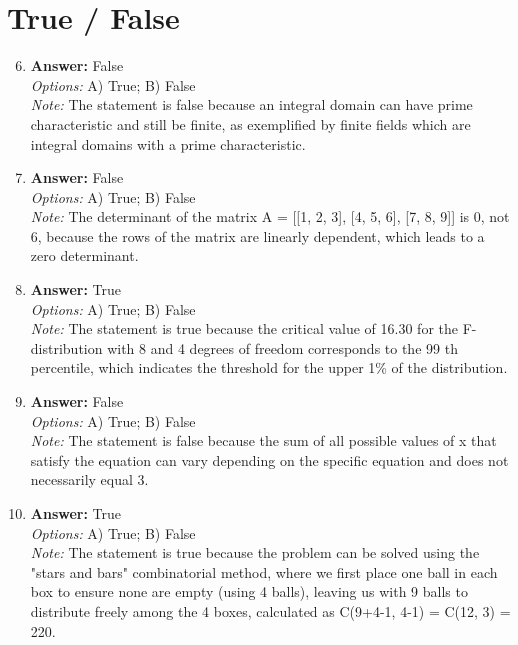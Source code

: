 \documentclass[12pt]{article}
\begin{document}
\section*{True / False}
\begin{enumerate}[label=\arabic*.]
\setcounter{enumi}{5}
\item \textbf{Answer:} False
\\ \textit{Options:} A) True; B) False
\\ \textit{Note:} The statement is false because an integral domain can have prime characteristic and still be finite, as exemplified by finite fields which are integral domains with a prime characteristic.
\item \textbf{Answer:} False
\\ \textit{Options:} A) True; B) False
\\ \textit{Note:} The determinant of the matrix A = [[1, 2, 3], [4, 5, 6], [7, 8, 9]] is 0, not 6, because the rows of the matrix are linearly dependent, which leads to a zero determinant.
\item \textbf{Answer:} True
\\ \textit{Options:} A) True; B) False
\\ \textit{Note:} The statement is true because the critical value of 16.30 for the F-distribution with 8 and 4 degrees of freedom corresponds to the 99 th percentile, which indicates the threshold for the upper 1\% of the distribution.
\item \textbf{Answer:} False
\\ \textit{Options:} A) True; B) False
\\ \textit{Note:} The statement is false because the sum of all possible values of x that satisfy the equation can vary depending on the specific equation and does not necessarily equal 3.
\item \textbf{Answer:} True
\\ \textit{Options:} A) True; B) False
\\ \textit{Note:} The statement is true because the problem can be solved using the "stars and bars" combinatorial method, where we first place one ball in each box to ensure none are empty (using 4 balls), leaving us with 9 balls to distribute freely among the 4 boxes, calculated as C(9+4-1, 4-1) = C(12, 3) = 220.
\end{enumerate}
\end{document}
